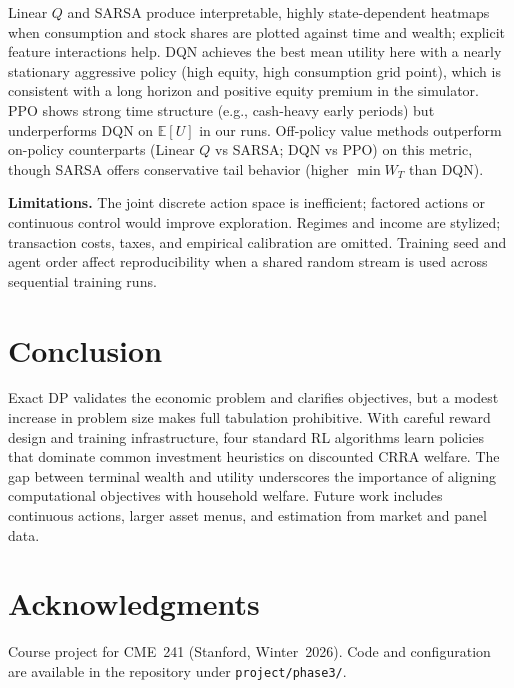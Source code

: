 \documentclass[11pt,a4paper]{article}
\begin{document}
Linear $Q$ and SARSA produce interpretable, highly state-dependent heatmaps when consumption and stock shares are plotted against time and wealth; explicit feature interactions help. DQN achieves the best mean utility here with a nearly stationary aggressive policy (high equity, high consumption grid point), which is consistent with a long horizon and positive equity premium in the simulator. PPO shows strong time structure (e.g., cash-heavy early periods) but underperforms DQN on $\mathbb{E}[U]$ in our runs. Off-policy value methods outperform on-policy counterparts (Linear $Q$ vs SARSA; DQN vs PPO) on this metric, though SARSA offers conservative tail behavior (higher $\min W_T$ than DQN).

\textbf{Limitations.} The joint discrete action space is inefficient; factored actions or continuous control would improve exploration. Regimes and income are stylized; transaction costs, taxes, and empirical calibration are omitted. Training seed and agent order affect reproducibility when a shared random stream is used across sequential training runs.

\section{Conclusion}

Exact DP validates the economic problem and clarifies objectives, but a modest increase in problem size makes full tabulation prohibitive. With careful reward design and training infrastructure, four standard RL algorithms learn policies that dominate common investment heuristics on discounted CRRA welfare. The gap between terminal wealth and utility underscores the importance of aligning computational objectives with household welfare. Future work includes continuous actions, larger asset menus, and estimation from market and panel data.

\section*{Acknowledgments}

Course project for CME~241 (Stanford, Winter~2026). Code and configuration are available in the repository under \texttt{project/phase3/}.
\end{document}
